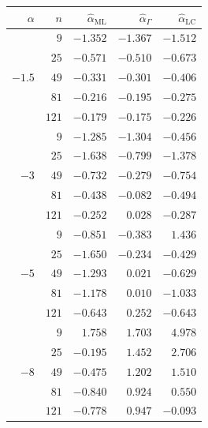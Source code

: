 \documentclass[10pt,a4paper]{article}
\begin{document}
\begin{minipage}{0.5\linewidth}
\begin{tabular}{rrrrr}
	\toprule
	$\alpha$ & $n$ & $\widehat{\alpha}_{\text{ML}}$ & $\widehat{\alpha}_{\Gamma}$ & $\widehat{\alpha}_{\text{LC}}$\\  
	\midrule
	\multirow{5 }{*}{$-1.5$} 
	& $9$   & $-1.352$ & $-1.367$ & $-1.512$ \\ 
	& $25$  & $-0.571$ & $-0.510$ & $-0.673$ \\ 
	& $49$  & $-0.331$ & $-0.301$ & $-0.406$ \\ 
	& $81$  & $-0.216$ & $-0.195$ & $-0.275$ \\ 
	& $121$ & $-0.179$ & $-0.175$ & $-0.226$ \\ 
	\midrule
	\multirow{5 }{*}{$-3$}
	& $9$   & $-1.285$ & $-1.304$ & $-0.456$ \\ 
	& $25$  & $-1.638$ & $-0.799$ & $-1.378$ \\ 
	& $49$  & $-0.732$ & $-0.279$ & $-0.754$ \\ 
	& $81$  & $-0.438$ & $-0.082$ & $-0.494$ \\ 
	& $121$ & $-0.252$ & $ 0.028$ & $-0.287$ \\ 
	\midrule
	\multirow{5 }{*}{$-5$}
	& $9$   & $-0.851$ & $-0.383$ & $ 1.436$ \\ 
	& $25$  & $-1.650$ & $-0.234$ & $-0.429$ \\ 
	& $49$  & $-1.293$ & $ 0.021$ & $-0.629$ \\ 
	& $81$  & $-1.178$ & $ 0.010$ & $-1.033$ \\ 
	& $121$ & $-0.643$ & $ 0.252$ & $-0.643$ \\
	\midrule
	\multirow{5 }{*}{$-8$} 
	& $9$   & $ 1.758$ & $1.703$ & $ 4.978$ \\ 
	& $25$  & $-0.195$ & $1.452$ & $ 2.706$ \\ 
	& $49$  & $-0.475$ & $1.202$ & $ 1.510$ \\ 
	& $81$  & $-0.840$ & $0.924$ & $ 0.550$ \\ 
	& $121$ & $-0.778$ & $0.947$ & $-0.093$ \\ 
	\bottomrule
\end{tabular}
\end{minipage}

\vspace{1cm}
\end{document}
